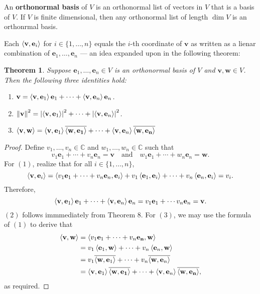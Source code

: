 \documentclass[11pt]{article}
\renewcommand{\vec}[1]{\mathbf{#1}}
\newcommand{\conjugate}[1]{\overline{#1}}
\newtheorem{theorem}{Theorem}
\begin{document}
An \textbf{orthonormal basis} of $V$ is an orthonormal list of vectors in $V$ that is a basis of $V$. If $V$ is finite dimensional, then any orthonormal list of length $\dim V$ is an orthonrmal basis.

\newpage

Each $\ev{\vec{v}, \vec{e}_{i}}$ for $i \in \{ 1, \ldots, n \}$ equals the $i$-th coordinate of $\vec{v}$ as written as a lienar combination of $\vec{e}_{1}, \ldots, \vec{e}_{n}$ --- an idea expanded upon in the following theorem:

\begin{adjustwidth}{0.5cm}{}
  \begin{theorem}
	  Suppose $\vec{e}_{1}, \ldots, \vec{e}_{n} \in V$ is an orthonormal basis of $V$ and $\vec{v}, \vec{w} \in V$. Then the following three identities hold:
	  \begin{enumerate}
		  \item $\vec{v} = \ev{\vec{v}, \vec{e}_{1}} \vec{e}_{1} + \cdots + \ev{\vec{v}, \vec{e}_{n}} \vec{e}_{n}$.
		  \item $\norm{\vec{v}}^{2} = \abs{\ev{\vec{v}, \vec{e}_{1}}}^{2} + \cdots + \abs{\ev{\vec{v}, \vec{e}_{n}}}^{2}$.
		  \item $\ev{\vec{v}, \vec{w}} = \ev{\vec{v}, \vec{e}_{1}} \conjugate{\ev{\vec{w}, \vec{e_{1}}}} + \cdots + \ev{\vec{v}, \vec{e}_{n}} \conjugate{\ev{\vec{w}, \vec{e_{n}}}}$
	  \end{enumerate}
  \end{theorem}
	\begin{proof}
		Define $v_{1}, \ldots, v_{n} \in \mathbb{C}$ and $w_{1}, \ldots, w_{n} \in \mathbb{C}$ such that
		\[
			v_{1} \vec{e}_{1} + \cdots + v_{n} \vec{e}_{n} = \vec{v} \quad \text{and} \quad w_{1} \vec{e}_{1} + \cdots + w_{n} \vec{e}_{n} = \vec{w}.
		\]
		For $(1)$, realize that for all $i \in \{ 1, \ldots, n \}$, 
		\[
			\ev{\vec{v}, \vec{e}_{i}} = \ev{v_{1} \vec{e}_{1} + \cdots + v_{n} \vec{e}_{n}, \vec{e}_{i}} + v_{1} \ev{\vec{e}_{1}, \vec{e}_{i}} + \cdots + v_{n} \ev{\vec{e}_{n}, \vec{e}_{i}} = v_{i}.
		\]
		Therefore, 
		\[
			\ev{\vec{v}, \vec{e}_{1}} \vec{e}_{1} + \cdots + \ev{\vec{v}, \vec{e}_{n}} \vec{e}_{n} = v_{1} \vec{e}_{1} + \cdots v_{n} \vec{e}_{n} = \vec{v}.
		\]
		$(2)$ follows immmediately from Theorem 8. For $(3)$, we may use the formula of $(1)$ to derive that
		\begin{align*}
			\ev{\vec{v}, \vec{w}} &= \ev{v_{1} \vec{e}_{1} + \cdots + v_{n} \vec{e_{n}}, \vec{w}} \\
			&= v_{1} \ev{\vec{e}_{1}, \vec{w}} + \cdots + v_{n} \ev{\vec{e}_{n}, \vec{w}} \\
			&= v_{1} \conjugate{\ev{\vec{w}, \vec{e}_{1}}} + \cdots + v_{n} \conjugate{\ev{\vec{w}, \vec{e}_{n}}} \\
			&= \ev{\vec{v}, \vec{e}_{1}} \conjugate{\ev{\vec{w}, \vec{e_{1}}}} + \cdots + \ev{\vec{v}, \vec{e}_{n}} \conjugate{\ev{\vec{w}, \vec{e_{n}}}},
		\end{align*}
		as required.	
	\end{proof}
\end{adjustwidth}

\end{document}
